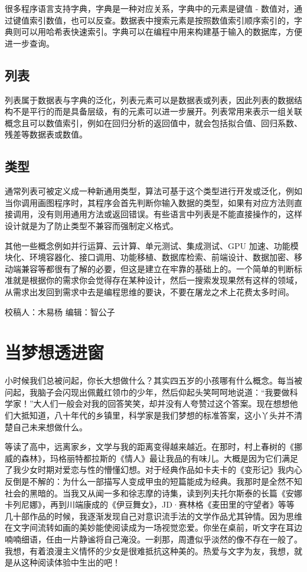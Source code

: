 \documentclass[]{book}
\begin{document}
很多程序语言支持字典，字典是一种对应关系，字典中的元素是键值 - 数值对，通过键值索引数值，也可以反查。数据表中搜索元素是按照数值索引顺序索引的，字典则可以用哈希表快速索引。字典可以在编程中用来构建基于输入的数据库，方便进一步查询。

\hypertarget{ux5217ux8868}{%
\subsection{列表}\label{ux5217ux8868}}

列表属于数据表与字典的泛化，列表元素可以是数据表或列表，因此列表的数据结构不是平行的而是具备层级，有的元素可以进一步展开。列表常用来表示一组关联概念且可以数值索引，例如在回归分析的返回值中，就会包括拟合值、回归系数、残差等数据表或数值。

\hypertarget{ux7c7bux578b}{%
\subsection{类型}\label{ux7c7bux578b}}

通常列表可被定义成一种新通用类型，算法可基于这个类型进行开发或泛化，例如当你调用画图程序时，其程序会首先判断你输入数据的类型，如果有对应方法则直接调用，没有则用通用方法或返回错误。有些语言中列表是不能直接操作的，这样设计就是为了防止类型不兼容而强制定义格式。

其他一些概念例如并行运算、云计算、单元测试、集成测试、GPU 加速、功能模块化、环境容器化、接口调用、功能移植、数据库检索、前端设计、数据加密、移动端兼容等都很有了解的必要，但这是建立在牢靠的基础上的。一个简单的判断标准就是根据你的需求你会觉得存在某种设计，然后一搜索发现果然有这样的领域，从需求出发回到需求中去是编程思维的要诀，不要在屠龙之术上花费太多时间。

校稿人：木易杨
编辑：智公子

\hypertarget{ux5f53ux68a6ux60f3ux900fux8fdbux7a97}{%
\section{当梦想透进窗}\label{ux5f53ux68a6ux60f3ux900fux8fdbux7a97}}

小时候我们总被问起，你长大想做什么？其实四五岁的小孩哪有什么概念。每当被问起，我脑子会闪现出佩戴红领巾的少年，然后仰起头笑呵呵地说道：``我要做科学家！''大人们一般会对我的回答笑笑，却并没有人夸赞过这个答案。现在想想他们大抵知道，八十年代的乡镇里，科学家是我们梦想的标准答案，这小丫头并不清楚自己未来想做什么。

等读了高中，远离家乡，文学与我的距离变得越来越近。在那时，村上春树的《挪威的森林》，玛格丽特都拉斯的《情人》最让我品的有味儿。大概是因为它们满足了我少女时期对爱恋与性的懵懂幻想。对于经典作品如卡夫卡的《变形记》我内心反倒是不解的：为什么一部描写人变成甲虫的短篇能成为经典。我那时是全然不知社会的黑暗的。当我又从闻一多和徐志摩的诗集，读到列夫托尔斯泰的长篇《安娜卡列尼娜》，再到川端康成的《伊豆舞女》，JD·赛林格《麦田里的守望者》等等几十部作品的时候，我逐渐发现自己对意识流手法的文学作品尤其钟情。因为思维在文字间流转如画的美妙能使阅读成为一场视觉恋爱。你坐在桌前，听文字在耳边喃喃细语，任由一片静谧将自己淹没。一刹那，周遭似乎淡然的像不存在一般了。我想，有着浪漫主义情怀的少女是很难抵抗这种美的。热爱与文字为友，我想，就是从这种阅读体验中生出的吧！
\end{document}
